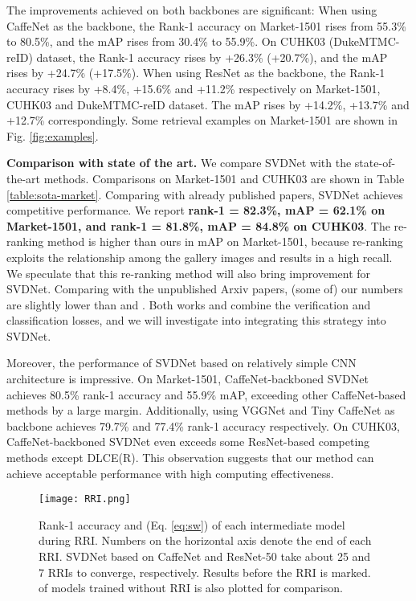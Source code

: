 \documentclass[10pt,twocolumn,letterpaper]{article}
\begin{document}
The improvements achieved on both backbones are significant: When using CaffeNet as the backbone, the Rank-1 accuracy on Market-1501 rises from 55.3\% to 80.5\%, and the mAP rises from 30.4\% to 55.9\%. On CUHK03 (DukeMTMC-reID) dataset, the Rank-1 accuracy rises by +26.3\% (+20.7\%), and the mAP rises by +24.7\% (+17.5\%). When using ResNet as the backbone, the Rank-1 accuracy rises by +8.4\%, +15.6\% and +11.2\% respectively on Market-1501, CUHK03 and DukeMTMC-reID dataset. The mAP rises by +14.2\%, +13.7\% and +12.7\% correspondingly. Some retrieval examples on Market-1501 are shown in Fig. \ref{fig:examples}.



\textbf{Comparison with state of the art.}
We compare SVDNet with the state-of-the-art methods. Comparisons on Market-1501 and CUHK03 are shown in Table \ref{table:sota-market}. Comparing with already published papers, SVDNet achieves competitive performance. We report \textbf{rank-1 = 82.3\%, mAP = 62.1\% on Market-1501, and rank-1 = 81.8\%, mAP = 84.8\% on CUHK03}. The re-ranking method \cite{DBLP:conf/cvpr/ZhongZCL17} is higher than ours in mAP on Market-1501, because re-ranking exploits the relationship among the gallery images and results in a high recall. We speculate that this re-ranking method will also bring improvement for SVDNet. Comparing with the unpublished Arxiv papers, (some of) our numbers are slightly lower than \cite{geng2016deep} and \cite{DBLP:journals/corr/ZhengZY16}. Both works \cite{geng2016deep} and \cite{DBLP:journals/corr/ZhengZY16} combine the verification and classification losses, and we will investigate into integrating this strategy into SVDNet.

Moreover, the performance of SVDNet based on relatively simple CNN architecture is impressive. On Market-1501, CaffeNet-backboned SVDNet achieves 80.5\% rank-1 accuracy and 55.9\% mAP, exceeding other CaffeNet-based methods by a large margin. Additionally, using VGGNet and Tiny CaffeNet as backbone achieves 79.7\% and 77.4\% rank-1 accuracy respectively. On CUHK03, CaffeNet-backboned SVDNet even exceeds some ResNet-based competing methods except DLCE(R). This observation suggests that our method can achieve acceptable performance with high computing effectiveness. 

\begin{figure*}[t]
\begin{center}
\texttt{[image: RRI.png]}
\end{center}
\setlength{\abovecaptionskip}{0cm}
   \caption{Rank-1 accuracy and  (Eq. \ref{eq:sw}) of each intermediate model during RRI. Numbers on the horizontal axis denote the end of each RRI. SVDNet based on CaffeNet and ResNet-50 take about 25 and 7 RRIs to converge, respectively. Results before the  RRI is marked.  of models trained without RRI is also plotted for comparison.}
\label{fig:RRI}
\end{figure*}
\end{document}
